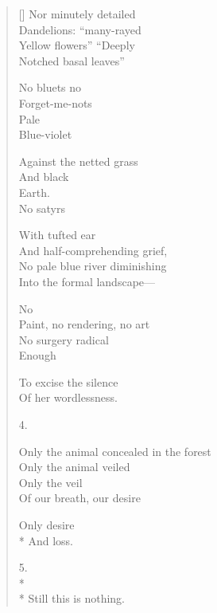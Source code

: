 \begin{verse}[\versewidth]
Nor minutely detailed\\
Dandelions: ``many-rayed\\
Yellow flowers'' ``Deeply\\
Notched basal leaves''

No bluets \qquad no\\
Forget-me-nots\\
Pale\\
Blue-violet

Against the netted grass\\
And black\\
Earth.\\
No satyrs

With tufted ear\\
And half-comprehending grief,\\
No pale blue river diminishing\\
Into the formal landscape---

No\\
Paint, no rendering, no art\\
No surgery radical\\
Enough

To excise the silence\\
Of her wordlessness.

4.

Only the animal concealed in the forest\\
Only the animal veiled\\
Only the veil\\
Of our breath, our desire

Only desire\\*
And loss.

5.\\*
~\\*
Still this is nothing. 
\end{verse}
